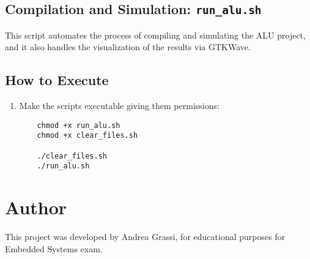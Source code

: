 \documentclass{article}
\begin{document}
\subsection{Compilation and Simulation: \texttt{run\_alu.sh}}
This script automates the process of compiling and simulating the ALU project, and it also handles the visualization of the results via GTKWave.

\subsection{How to Execute}
\begin{enumerate}
    \item Make the scripts executable giving them permissions:
    \begin{verbatim}
    chmod +x run_alu.sh
    chmod +x clear_files.sh
    
    ./clear_files.sh
    ./run_alu.sh
    \end{verbatim}
\end{enumerate}

\section{Author}
This project was developed by Andrea Grassi, for educational purposes for Embedded Systems exam.
\end{document}
